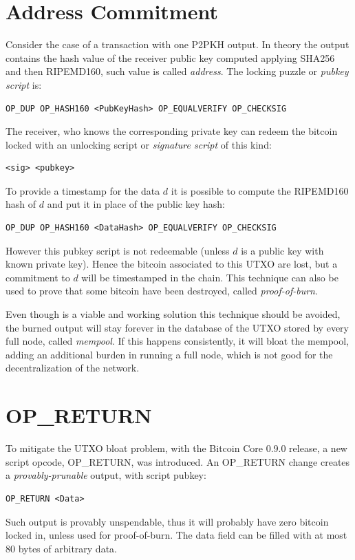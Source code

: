 \section{Address Commitment}
Consider the case of a transaction with one P2PKH output. In theory the output contains the hash value of the receiver public key computed applying SHA256 and then RIPEMD160, such value is called \textit{address}. The locking puzzle or \textit{pubkey script} is:
\begin{verbatim}
OP_DUP OP_HASH160 <PubKeyHash> OP_EQUALVERIFY OP_CHECKSIG
\end{verbatim}
The receiver, who knows the corresponding private key can redeem the bitcoin locked with an unlocking script or \textit{signature script} of this kind:
\begin{verbatim}
<sig> <pubkey>
\end{verbatim} 
To provide a timestamp for the data $d$ it is possible to compute the RIPEMD160 hash of $d$ and put it in place of the public key hash:
\begin{verbatim}
OP_DUP OP_HASH160 <DataHash> OP_EQUALVERIFY OP_CHECKSIG
\end{verbatim}
However this pubkey script is not redeemable (unless $d$ is a public key with known private key). Hence the bitcoin associated to this UTXO are lost, but a commitment to $d$ will be timestamped in the chain. 
This technique can also be used to prove that some bitcoin have been destroyed, called \textit{proof-of-burn}.

Even though is a viable and working solution this technique should be avoided, the burned output will stay forever in the database of the UTXO stored by every full node, called \textit{mempool}. If this happens consistently, it will bloat the mempool, adding an additional burden in running a full node, which is not good for the decentralization of the network.

\section{OP\_RETURN}
To mitigate the UTXO bloat problem, with the Bitcoin Core 0.9.0 release, a new script opcode, OP\_RETURN, was introduced. An OP\_RETURN change creates a \textit{provably-prunable} output, with script pubkey:
\begin{verbatim}
OP_RETURN <Data>
\end{verbatim}
Such output is provably unspendable, thus it will probably have zero bitcoin locked in, unless used for proof-of-burn. The data field can be filled with at most 80 bytes of arbitrary data. 

